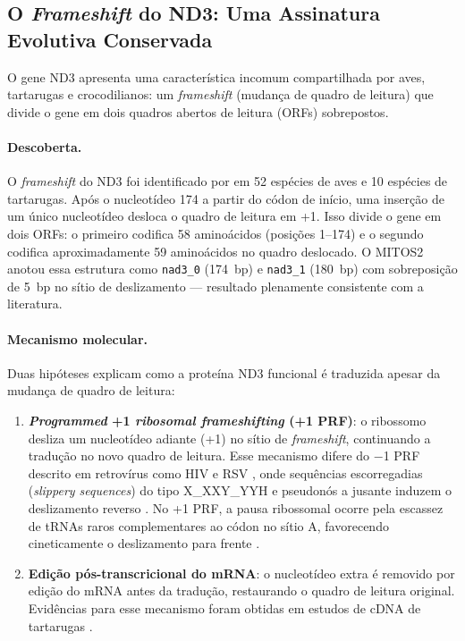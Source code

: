 \subsection{O \textit{Frameshift} do ND3: Uma Assinatura Evolutiva Conservada}
\label{subsec:nd3_frameshift}

O gene ND3 apresenta uma característica incomum compartilhada por aves, tartarugas e crocodilianos: um \textit{frameshift} (mudança de quadro de leitura) que divide o gene em dois quadros abertos de leitura (ORFs) sobrepostos.

\paragraph*{Descoberta.}

O \textit{frameshift} do ND3 foi identificado por  em 52 espécies de aves e 10 espécies de tartarugas. Após o nucleotídeo 174 a partir do códon de início, uma inserção de um único nucleotídeo desloca o quadro de leitura em +1. Isso divide o gene em dois ORFs: o primeiro codifica 58 aminoácidos (posições 1--174) e o segundo codifica aproximadamente 59 aminoácidos no quadro deslocado. O MITOS2 anotou essa estrutura como \texttt{nad3\_0} (174~bp) e \texttt{nad3\_1} (180~bp) com sobreposição de 5~bp no sítio de deslizamento --- resultado plenamente consistente com a literatura.

\paragraph*{Mecanismo molecular.}

Duas hipóteses explicam como a proteína ND3 funcional é traduzida apesar da mudança de quadro de leitura:

\begin{enumerate}[label=(\roman*)]
    \item \textbf{\textit{Programmed} +1 \textit{ribosomal frameshifting} (+1 PRF)}: o ribossomo desliza um nucleotídeo adiante (+1) no sítio de \textit{frameshift}, continuando a tradução no novo quadro de leitura. Esse mecanismo difere do $-$1 PRF descrito em retrovírus como HIV e RSV \cite{jacks1988}, onde sequências escorregadias (\textit{slippery sequences}) do tipo X\_XXY\_YYH e pseudonós a jusante induzem o deslizamento reverso \cite{brierley1995,atkins2016}. No +1 PRF, a pausa ribossomal ocorre pela escassez de tRNAs raros complementares ao códon no sítio A, favorecendo cineticamente o deslizamento para frente \cite{harger2002}.

    \item \textbf{Edição pós-transcricional do mRNA}: o nucleotídeo extra é removido por edição do mRNA antes da tradução, restaurando o quadro de leitura original. Evidências para esse mecanismo foram obtidas em estudos de cDNA de tartarugas \cite{russell2008}.
\end{enumerate}

